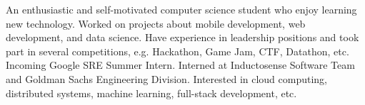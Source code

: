 

\begin{cvparagraph}

An enthusiastic and self-motivated computer science student who enjoy learning new technology. Worked on projects about mobile development, web development, and data science. Have experience in leadership positions and took part in several competitions, e.g. Hackathon, Game Jam, CTF, Datathon, etc. Incoming Google SRE Summer Intern. Interned at Inductosense Software Team and Goldman Sachs Engineering Division. Interested in cloud computing, distributed systems, machine learning, full-stack development, etc.
\end{cvparagraph}
